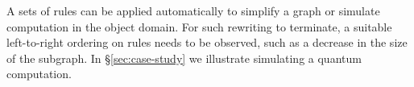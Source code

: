 \documentclass[runningheads]{llncs}
\begin{document}
A sets of rules can be applied automatically to simplify a graph or
simulate computation in the object domain. For such rewriting to
terminate, a suitable left-to-right ordering on rules needs to be
observed, such as a decrease in the size of the subgraph. In
\S\ref{sec:case-study} we illustrate simulating a quantum computation.









\end{document}
